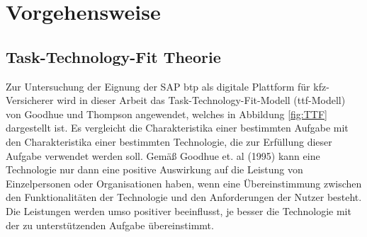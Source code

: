 \clearpage
\chapter{Vorgehensweise}
\section{Task-Technology-Fit Theorie}






Zur Untersuchung der Eignung der SAP \ac{btp} als digitale Plattform für \ac{kfz}-Versicherer wird in dieser Arbeit das Task-Technology-Fit-Modell (\acs{ttf}-Modell) von Goodhue und Thompson angewendet, welches in Abbildung \ref{fig:TTF} dargestellt ist. Es vergleicht die Charakteristika einer bestimmten Aufgabe mit den Charakteristika einer bestimmten Technologie, die zur Erfüllung dieser Aufgabe verwendet werden soll. Gemäß Goodhue et. al (1995) kann eine Technologie nur dann eine positive Auswirkung auf die Leistung von Einzelpersonen oder Organisationen haben, wenn eine Übereinstimmung zwischen den Funktionalitäten der Technologie und den Anforderungen der Nutzer besteht. Die Leistungen werden umso positiver beeinflusst, je besser die Technologie mit der zu unterstützenden Aufgabe übereinstimmt.\autocite[Vgl.][S. 214-216]{GOODHUE1995}



